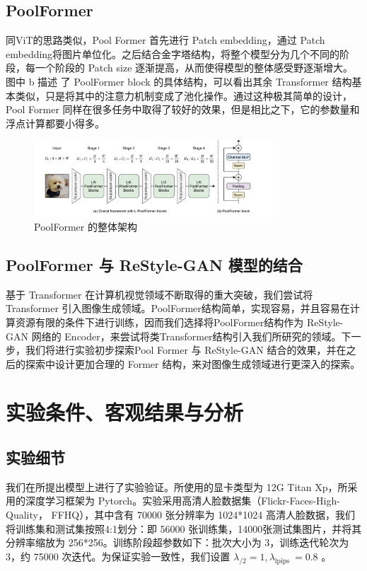 \subsection{PoolFormer}

同ViT的思路类似，Pool Former 首先进行 Patch embedding，通过 Patch embedding将图片单位化。之后结合金字塔结构，将整个模型分为几个不同的阶段，每一个阶段的 Patch size 逐渐提高，从而使得模型的整体感受野逐渐增大。图中 b 描述 了 PoolFormer block 的具体结构，可以看出其余 Transformer 结构基本类似，只是将其中的注意力机制变成了池化操作。通过这种极其简单的设计，Pool Former 同样在很多任务中取得了较好的效果，但是相比之下，它的参数量和浮点计算都要小得多。

\begin{figure}[htb]
\centering 
\includegraphics[width=0.8\textwidth]{img/m3p6.png} 
\caption{PoolFormer 的整体架构}
\label{Test}
\end{figure}

\subsection{PoolFormer 与 ReStyle-GAN 模型的结合}

基于 Transformer 在计算机视觉领域不断取得的重大突破，我们尝试将 Transformer 引入图像生成领域。PoolFormer结构简单，实现容易，并且容易在计算资源有限的条件下进行训练，因而我们选择将PoolFormer结构作为 ReStyle-GAN 网络的 Encoder，来尝试将类Transformer结构引入我们所研究的领域。下一步，我们将进行实验初步探索Pool Former 与 ReStyle-GAN 结合的效果，并在之后的探索中设计更加合理的 Former 结构，来对图像生成领域进行更深入的探索。

\section{实验条件、客观结果与分析}

\subsection{实验细节}
我们在所提出模型上进行了实验验证。所使用的显卡类型为 12G Titan Xp，所采用的深度学习框架为 Pytorch。实验采用高清人脸数据集（Flickr-Faces-High-Quality， FFHQ），其中含有 70000 张分辨率为 1024*1024 高清人脸数据，我们将训练集和测试集按照4:1划分：即 56000 张训练集，14000张测试集图片，并将其分辨率缩放为 256*256。训练阶段超参数如下：批次大小为 3，训练迭代轮次为 3，约 75000 次迭代。为保证实验一致性，我们设置 $\lambda_{/ 2}=1, \lambda_{\text {lpips }}=0.8$ 。

